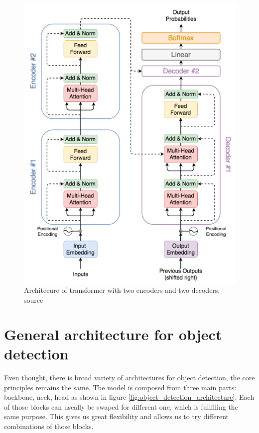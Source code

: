 \begin{figure}
    \centering
    \includegraphics[width=\linewidth]{images/two_layer_transformer.png}
    \caption{Architecure of transformer with two encoders and two decoders, source \cite{Yin2020}}
    \label{fig:nlp_transformer}
\end{figure}

\section{General architecture for object detection}
Even thought, there is broad variety of architectures for object detection, the core principles remains the same. The model is composed from three main parts: backbone, neck, head as shown in figure \ref{fig:object_detection_architecture}. Each of those blocks can useally be swaped for different one, which is fullfiling the same purpose. This gives us great flexibility and allows us to try different combinations of those blocks.

